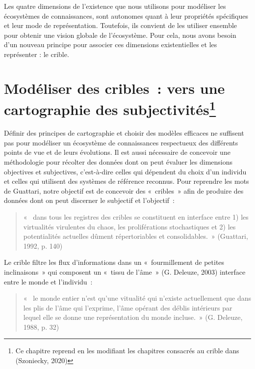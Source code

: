 \documentclass[
  a4paper,
  DIV=11,
  numbers=noendperiod]{scrreprt}
\begin{document}
Les quatre dimensions de l'existence que nous utilisons pour modéliser
les écosystèmes de connaissances, sont autonomes quant à leur propriétés
spécifiques et leur mode de représentation. Toutefois, ils convient de
les utiliser ensemble pour obtenir une vision globale de l'écosystème.
Pour cela, nous avons besoin d'un nouveau principe pour associer ces
dimensions existentielles et les représenter : le crible.

\section[Modéliser des cribles~: vers une cartographie des
subjectivités]{\texorpdfstring{Modéliser des cribles~: vers une
cartographie des
subjectivités\footnote{Ce chapitre reprend en les modifiant les
  chapitres consacrés au crible dans (Szoniecky, 2020)}}{Modéliser des cribles~: vers une cartographie des subjectivités}}\label{sec-modeliserCrible}

Définir des principes de cartographie et choisir des modèles efficaces
ne suffisent pas pour modéliser un écosystème de connaissances
respectueux des différents points de vue et de leurs évolutions. Il est
aussi nécessaire de concevoir une méthodologie pour récolter des données
dont on peut évaluer les dimensions objectives et subjectives,
c'est-à-dire celles qui dépendent du choix d'un individu et celles qui
utilisent des systèmes de référence reconnus. Pour reprendre les mots de
Guattari, notre objectif est de concevoir des «~cribles~» afin de
produire des données dont on peut discerner le subjectif et l'objectif~:

\begin{quote}
«~ dans tous les registres des cribles se constituent en interface entre
1) les virtualités virulentes du chaos, les proliférations stochastiques
et 2) les potentialités actuelles dûment répertoriables et
consolidables.~» (Guattari, 1992, p. 140)
\end{quote}

Le crible filtre les flux d'informations dans un «~fourmillement de
petites inclinaisons~» qui composent un «~tissu de l'âme~» (G. Deleuze,
2003) interface entre le monde et l'individu~:

\begin{quote}
«~ le monde entier n'est qu'une vitualité qui n'existe actuellement que
dans les plis de l'âme qui l'exprime, l'âme opérant des déblis
intérieurs par lequel elle se donne une représentation du monde
incluse.~» (G. Deleuze, 1988, p. 32)
\end{quote}
\end{document}
